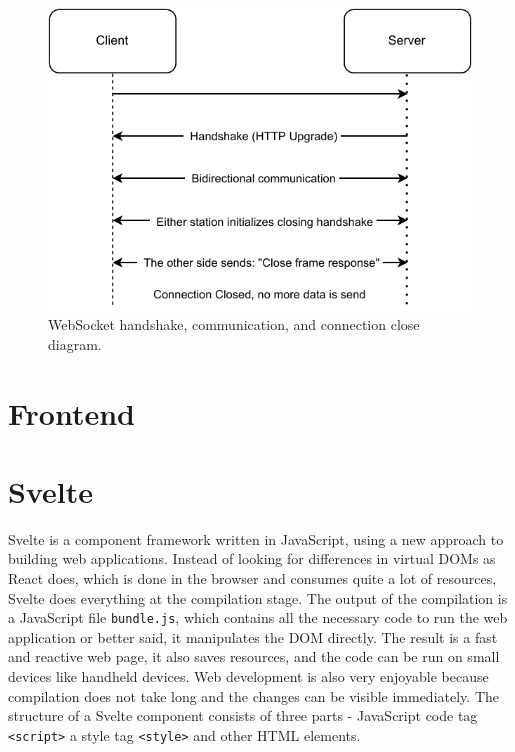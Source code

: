 \begin{figure}[h]
    \centering
    \includegraphics{pdf/websocket.drawio.pdf}
    \caption{WebSocket handshake, communication, and connection close diagram.}
    \label{fig:websocket}
\end{figure}



\section{Frontend}\label{txt.design.frontend}
\section{Svelte}\label{txt.design.frontend.svelte}

Svelte is a component framework written in JavaScript, using a new approach to building web applications. Instead of looking for differences in virtual DOMs as React does, which is done in the browser and consumes quite a lot of resources, Svelte does everything at the compilation stage. The output of the compilation is a JavaScript file \verb|bundle.js|, which contains all the necessary code to run the web application or better said, it manipulates the DOM directly. The result is a fast and reactive web page, it also saves resources, and the code can be run on small devices like handheld devices. Web development is also very enjoyable because compilation does not take long and the changes can be visible immediately. The structure of a Svelte component consists of three parts - JavaScript code tag \verb|<script>| a style tag \verb|<style>| and other HTML elements. 


